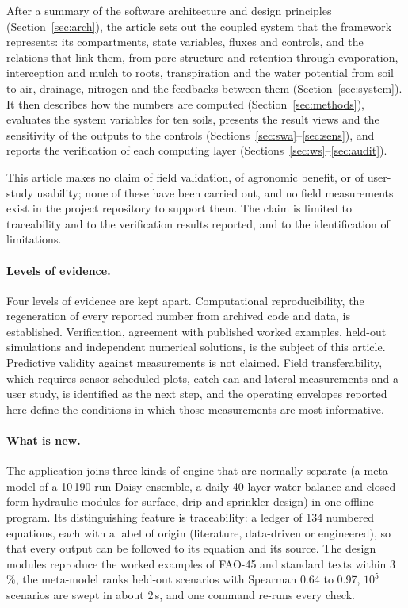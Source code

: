 After a summary of the software architecture and design principles (Section~\ref{sec:arch}), the article sets out the coupled system that the framework represents: its compartments, state variables, fluxes and controls, and the relations that link them, from pore structure and retention through evaporation, interception and mulch to roots, transpiration and the water potential from soil to air, drainage, nitrogen and the feedbacks between them (Section~\ref{sec:system}). It then describes how the numbers are computed (Section~\ref{sec:methods}), evaluates the system variables for ten soils, presents the result views and the sensitivity of the outputs to the controls (Sections~\ref{sec:swa}--\ref{sec:sens}), and reports the verification of each computing layer (Sections~\ref{sec:ws}--\ref{sec:audit}).

This article makes no claim of field validation, of agronomic benefit, or of user-study usability; none of these have been carried out, and no field measurements exist in the project repository to support them. The claim is limited to traceability and to the verification results reported, and to the identification of limitations.

\paragraph{Levels of evidence.} Four levels of evidence are kept apart. Computational reproducibility, the regeneration of every reported number from archived code and data, is established. Verification, agreement with published worked examples, held-out simulations and independent numerical solutions, is the subject of this article. Predictive validity against measurements is not claimed. Field transferability, which requires sensor-scheduled plots, catch-can and lateral measurements and a user study, is identified as the next step, and the operating envelopes reported here define the conditions in which those measurements are most informative.

\paragraph{What is new.} The application joins three kinds of engine that are normally separate (a meta-model of a 10\,190-run Daisy ensemble, a daily 40-layer water balance and closed-form hydraulic modules for surface, drip and sprinkler design) in one offline program. Its distinguishing feature is traceability: a ledger of 134 numbered equations, each with a label of origin (literature, data-driven or engineered), so that every output can be followed to its equation and its source. The design modules reproduce the worked examples of FAO-45 and standard texts within 3\,\%, the meta-model ranks held-out scenarios with Spearman 0.64 to 0.97, $10^5$ scenarios are swept in about 2\,s, and one command re-runs every check.


